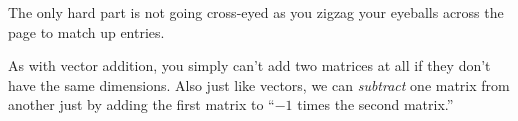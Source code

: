 The only hard part is not going cross-eyed as you zigzag your eyeballs across
the page to match up entries.

As with vector addition, you simply can't add two matrices at all if they don't
have the same dimensions. Also just like vectors, we can \textit{subtract} one
matrix from another just by adding the first matrix to ``$-1$ times the second
matrix.''

%
%
%
%
%
%
%
%
%
%
%
%

